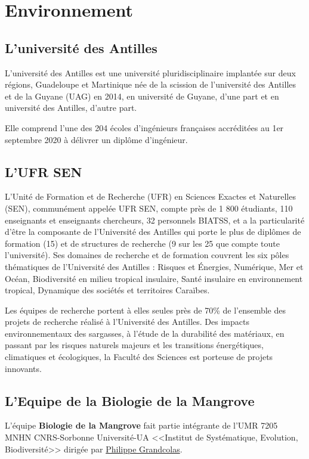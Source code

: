 \chapter{Environnement}
    \section{L'université des Antilles}
    L’université des Antilles est une université pluridisciplinaire implantée sur deux régions, Guadeloupe et Martinique née de la scission de l’université des Antilles et de la Guyane (UAG) en 2014, en université de Guyane, d’une part et en université des Antilles, d’autre part.

    \vspace{0.5cm}

    Elle comprend l'une des 204 écoles d'ingénieurs françaises accréditées au 1er septembre 2020 à délivrer un diplôme d'ingénieur.

    \section{L'UFR SEN}
    L’Unité de Formation et de Recherche (UFR) en Sciences Exactes et Naturelles (SEN), communément appelée UFR SEN, compte près de 1 800 étudiants, 110 enseignants et enseignants chercheurs, 32 personnels BIATSS, et a la particularité d’être la composante de l’Université des Antilles qui porte le plus de diplômes de formation (15) et de structures de recherche (9 sur les 25 que compte toute l’université). 
    Ses domaines de recherche et de formation couvrent les six pôles thématiques de l’Université des Antilles : Risques et Énergies, Numérique, Mer et Océan, Biodiversité en milieu tropical insulaire, Santé insulaire en environnement tropical, Dynamique des sociétés et territoires Caraïbes.

    \vspace{0.5cm}

    Les équipes de recherche portent à elles seules près de 70\% de l’ensemble des projets de recherche réalisé à l’Université des Antilles.
    Des impacts environnementaux des sargasses, à l’étude de la durabilité des matériaux, en passant par les risques naturels majeurs et les transitions énergétiques, climatiques et écologiques, la Faculté des Sciences est porteuse de projets innovants. 

    \vspace{2cm}

    \section{L'Equipe de la Biologie de la Mangrove}
    L'équipe \textbf{Biologie de la Mangrove} fait partie intégrante de l'UMR 7205 MNHN CNRS-Sorbonne Université-UA <<Institut de Systématique, Evolution, Biodiversité>> dirigée par \underline{Philippe Grandcolas}.

